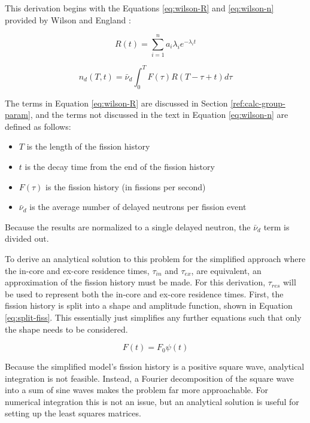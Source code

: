 \renewcommand{\theequation}{A\thechapter.\arabic{equation}}
\label{ref:appendixA}

This derivation begins with the Equations \eqref{eq:wilson-R} and \eqref{eq:wilson-n} provided by Wilson and England \cite{wilson2002delayed}:

\begin{equation}
    R(t) = \sum_{i=1}^{n} a_i \lambda_i e^{-\lambda_i t}
    \label{eq:wilson-R}
\end{equation}

\begin{equation}
    n_d(T, t) = \bar{\nu}_d \int_{0}^{T} F(\tau) R(T-\tau+t) d\tau
    \label{eq:wilson-n}
\end{equation}

The terms in Equation \eqref{eq:wilson-R} are discussed in Section \ref{ref:calc-group-param}, and the terms not discussed in the text in Equation \eqref{eq:wilson-n} are defined as follows:
\begin{itemize}
    \setlength\itemsep{-0.25em}
    \item $T$ is the length of the fission history
    \item $t$ is the decay time from the end of the fission history
    \item $F(\tau)$ is the fission history (in fissions per second)
    \item $\bar{\nu}_d$ is the average number of delayed neutrons per fission event
    \end{itemize}

Because the results are normalized to a single delayed neutron, the $\bar{\nu}_d$ term is divided out.

To derive an analytical solution to this problem for the simplified approach where the in-core and ex-core residence times, $\tau_{in}$ and $\tau_{ex}$, are equivalent, an approximation of the fission history must be made.
For this derivation, $\tau_{res}$ will be used to represent both the in-core and ex-core residence times.
First, the fission history is split into a shape and amplitude function, shown in Equation \eqref{eq:split-fiss}.
This essentially just simplifies any further equations such that only the shape needs to be considered.

\begin{equation}
    F(t) = F_0 \psi(t)
    \label{eq:split-fiss}
\end{equation}

Because the simplified model's fission history is a positive square wave, analytical integration is not feasible.
Instead, a Fourier decomposition of the square wave into a sum of sine waves makes the problem far more approachable.
For numerical integration this is not an issue, but an analytical solution is useful for setting up the least squares matrices.

